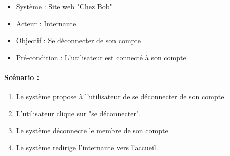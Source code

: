 \begin{boxedminipage}[t]{12cm}
	\begin{itemize}
		\item Système : Site web "Chez Bob"
		\item Acteur : Internaute
		\item Objectif : Se déconnecter de son compte
		\item Pré-condition : L'utilisateur est connecté à son compte
	\end{itemize}

	\renewcommand\theenumi{\arabic{enumi}}
	\renewcommand\labelenumi{\theenumi .}
	\renewcommand\theenumii{\Alph{enumii}}
	\renewcommand\labelenumii{(\theenumii)}
	\paragraph{Scénario :} 
	\begin{enumerate}
		\item \label{sc3l1} Le système propose à l'utilisateur de se déconnecter de son compte.
		\item \label{sc3l2} L'utilisateur clique sur "se déconnecter".
		\item \label{sc3l3} Le système déconnecte le membre de son compte.
		\item \label{sc3l4} Le système redirige l'internaute vers l'accueil.
	\end{enumerate}
\end{boxedminipage}
\newpage

\renewcommand\theenumi{\arabic{enumi}}
\renewcommand\labelenumi{\theenumi .}
\renewcommand\theenumii{\Alph{enumii}}
\renewcommand\labelenumii{(\theenumii)}